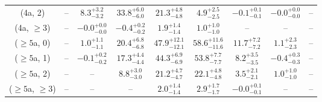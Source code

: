 \begin{table}[h!]
{\begin{tabular}{ccccccccc}
	(4a, 2) & -- & $8.3^{+ 3.2 }_{- 3.2 }$ & $33.8^{+ 6.0 }_{- 6.0 }$ & $21.3^{+ 4.8 }_{- 4.8 }$ & $4.9^{+ 2.5 }_{- 2.5 }$ & $-0.1^{+ 0.1 }_{- 0.1 }$ & $-0.0^{+ 0.0 }_{- 0.0 }$ & -- \\[0.5ex] 
	(4a, $\ge3$) & -- & $-0.0^{+ 0.0 }_{- 0.0 }$ & $-0.4^{+ 0.2 }_{- 0.2 }$ & $1.9^{+ 1.4 }_{- 1.4 }$ & $1.0^{+ 1.0 }_{- 1.0 }$ & -- & -- & -- \\[0.5ex] 
	($\ge5$a, 0) & -- & $1.0^{+ 1.1 }_{- 1.1 }$ & $20.4^{+ 6.8 }_{- 6.8 }$ & $47.9^{+ 12.1 }_{- 12.1 }$ & $58.6^{+ 11.6 }_{- 11.6 }$ & $11.7^{+ 7.2 }_{- 7.2 }$ & $1.1^{+ 2.3 }_{- 2.3 }$ & -- \\[0.5ex] 
	($\ge5$a, 1) & -- & $-0.1^{+ 0.2 }_{- 0.2 }$ & $17.3^{+ 4.4 }_{- 4.4 }$ & $44.3^{+ 6.9 }_{- 6.9 }$ & $53.8^{+ 7.7 }_{- 7.7 }$ & $8.2^{+ 3.5 }_{- 3.5 }$ & $-0.4^{+ 0.3 }_{- 0.3 }$ & -- \\[0.5ex] 
	($\ge5$a, 2) & -- & -- & $8.8^{+ 3.0 }_{- 3.0 }$ & $21.2^{+ 4.7 }_{- 4.7 }$ & $22.1^{+ 4.8 }_{- 4.8 }$ & $3.5^{+ 2.1 }_{- 2.1 }$ & $1.0^{+ 1.0 }_{- 1.0 }$ & -- \\[0.5ex] 
	($\ge5$a, $\ge3$) & -- & -- & -- & $2.0^{+ 1.4 }_{- 1.4 }$ & $2.9^{+ 1.7 }_{- 1.7 }$ & $-0.0^{+ 0.1 }_{- 0.1 }$ & -- & -- \\[0.5ex] 
	\hline
	\hline
\end{tabular}}
\end{table}
